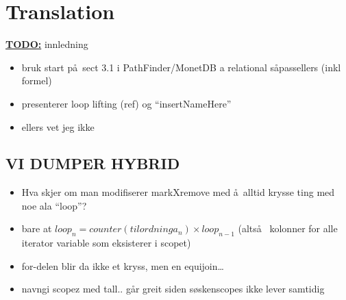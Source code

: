 \chapter{Translation}


\textbf{\underline{\LARGE TODO:}} innledning
\begin{itemize}
  \item bruk start p\aa~sect 3.1 i  PathFinder/MonetDB a relational s\aa passellers (inkl formel)
  \item presenterer loop lifting (ref) og ``insertNameHere''
  \item ellers vet jeg ikke
\end{itemize}





\section{VI DUMPER HYBRID}
\begin{itemize}
  \item Hva skjer om man modifiserer markXremove med \aa~alltid krysse ting med
  noe ala ``loop''?
  \item bare at $loop_{n} = counter(tilordninga_{n}) \times loop_{n-1}$
  (alts\aa~ kolonner for alle iterator variable som eksisterer i scopet)
  \item for-delen blir da ikke et kryss, men en equijoin\ldots
  \item navngi scopez med tall.. g\aa r greit siden s\o skenscopes ikke lever
  samtidig
\end{itemize}
